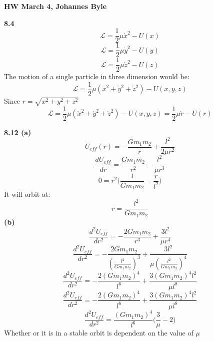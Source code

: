 \documentclass[english]{article}
\begin{document}
\begin{multicols*}{2}
\textbf{HW March 4, Johannes Byle}\\
\newcommand{\Lagr}{\mathcal{L}}

\noindent
\textbf{8.4}
$$\Lagr=\frac{1}{2}\mu\dot{x}^2-U(x)$$
$$\Lagr=\frac{1}{2}\mu\dot{y}^2-U(y)$$
$$\Lagr=\frac{1}{2}\mu\dot{z}^2-U(z)$$
The motion of a single particle in three dimension would be:
$$\Lagr=\frac{1}{2}\mu(\dot{x}^2+\dot{y}^2+\dot{z}^2)-U(x,y,z)$$
Since $r=\sqrt{x^2+y^2+z^2}$
$$\Lagr=\frac{1}{2}\mu(\dot{x}^2+\dot{y}^2+\dot{z}^2)-U(x,y,z)=\frac{1}{2}\mu\dot{r}-U(r)$$

\noindent
\textbf{8.12 (a)}
$$U_{eff}(r)=-\frac{Gm_1m_2}{r}+\frac{l^2}{2\mu r^2}$$	
$$\frac{dU_{eff}}{dr}=\frac{Gm_1m_2}{r^2}-\frac{l^2}{\mu r^3}$$
$$0=r^2\Big(\frac{1}{Gm_1m_2}-\frac{r}{l^2}\big)$$
It will orbit at:
$$r=\frac{l^2}{Gm_1m_2}$$
\textbf{(b)} $$\frac{d^2U_{eff}}{dr^2}=-\frac{2Gm_1m_2}{r^3}+\frac{3l^2}{\mu r^4}$$
$$\frac{d^2U_{eff}}{dr^2}=-\frac{2Gm_1m_2}{(\frac{l^2}{Gm_1m_2})^3}+\frac{3l^2}{\mu (\frac{l^2}{Gm_1m_2})^4}$$
$$\frac{d^2U_{eff}}{dr^2}=-\frac{2(Gm_1m_2)^4}{l^6}+\frac{3(Gm_1m_2)^4l^2}{\mu l^8}$$
$$\frac{d^2U_{eff}}{dr^2}=-\frac{2(Gm_1m_2)^4}{l^6}+\frac{3(Gm_1m_2)^4l^2}{\mu l^8}$$
$$\frac{d^2U_{eff}}{dr^2}=\frac{(Gm_1m_2)^4}{l^6}\Big(\frac{3}{\mu}-2\Big)$$
Whether or it is in a stable orbit is dependent on the value of $\mu$ 
\end{multicols*}
\end{document}
